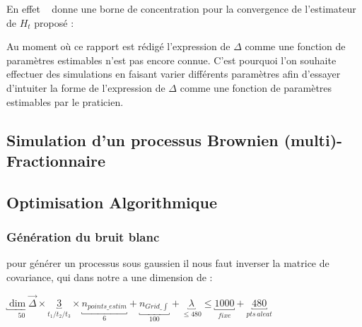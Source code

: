 En effet ~\cite[Thm 1]{maissoro-SmoothnessFTSweakDep} donne une borne de concentration pour la convergence de l'estimateur de $H_t$ proposé :


Au moment où ce rapport est rédigé l'expression de $\Delta$ comme une fonction de paramètres estimables n'est pas encore connue. C'est pourquoi l'on souhaite effectuer des simulations en faisant varier différents paramètres afin d'essayer d'intuiter la forme de l'expression de $\Delta$ comme une fonction de paramètres estimables par le praticien.

\citationrequise

\subsection{Simulation d'un processus Brownien (multi)-Fractionnaire}


\subsection{Optimisation Algorithmique}

\subsubsection{Génération du bruit blanc}

pour générer un processus sous gaussien il nous faut inverser la matrice de covariance, qui dans notre a une dimension de :

$\underbracket{\dim \vec\Delta}_{50} \times \underbracket{3}_{t_1 / t_2 / t_3} \times \underbracket{n_{points\_estim}}_{6} + \underbracket{n_{Grid\_\int}}_{100} + \underbracket{\lambda}_{\leq 480} \leq \underbracket{1000}_{fixe} + \underbracket{480}_{pts \, aleat}$

